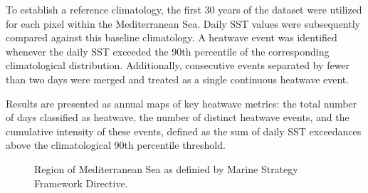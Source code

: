 \documentclass[
  number]{elsarticle}
\begin{document}
To establish a reference climatology, the first 30 years of the dataset
were utilized for each pixel within the Mediterranean Sea. Daily SST
values were subsequently compared against this baseline climatology. A
heatwave event was identified whenever the daily SST exceeded the 90th
percentile of the corresponding climatological distribution.
Additionally, consecutive events separated by fewer than two days were
merged and treated as a single continuous heatwave event.

Results are presented as annual maps of key heatwave metrics: the total
number of days classified as heatwave, the number of distinct heatwave
events, and the cumulative intensity of these events, defined as the sum
of daily SST exceedances above the climatological 90th percentile
threshold.

\label{cell-fig-MapMedSea}
\begin{figure}[H]


\caption{\label{fig-MapMedSea}Region of Mediterranean Sea as definied by
Marine Strategy Framework Directive.}

\end{figure}%



\end{document}
